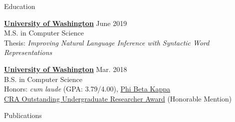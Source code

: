 \documentclass{resume}
\begin{document}
\begin{rSection}{Education}

  {\href{https://www.cs.washington.edu/}
    {\bf University of Washington}} \hfill {June 2019} \\
  M.S. in Computer Science \\
  Thesis: \emph{Improving Natural Language Inference with Syntactic Word Representations}

  \vspace{-0.2em}
  {\href{https://www.cs.washington.edu/}
        {\bf University of Washington}} \hfill {Mar. 2018} \\
  B.S. in Computer Science \\
  Honors: \emph{cum laude} (GPA: 3.79/4.00), \href{https://www.pbk.org/web}
    {Phi Beta Kappa} \\
  \href{https://cra.org/about/awards/outstanding-undergraduate-researcher-award/}
       {CRA Outstanding Undergraduate Researcher Award} (Honorable Mention)

\end{rSection}

\begin{rSection}{Publications}
\vspace{1.5em}


\end{rSection}
\end{document}
